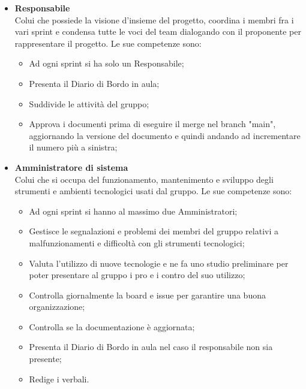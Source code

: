             \begin{itemize}
                \item \textbf{Responsabile}\\
                Colui che possiede la visione d'insieme del progetto, coordina i membri fra i vari sprint e condensa tutte le voci del team
                dialogando con il proponente per rappresentare il progetto.
                Le sue competenze sono:
                \begin{itemize}
                    \item Ad ogni sprint si ha solo un Responsabile;
                    \item Presenta il Diario di Bordo in aula;
                    \item Suddivide le attività del gruppo;
                    \item Approva i documenti prima di eseguire il merge nel branch "main", aggiornando la versione del documento e quindi andando ad incrementare il numero più a sinistra;
                \end{itemize}
                \item \textbf{Amministratore di sistema}\\
                Colui che si occupa del funzionamento, mantenimento e sviluppo degli strumenti e ambienti tecnologici
                usati dal gruppo.
                Le sue competenze sono:
                \begin{itemize}
                    \item Ad ogni sprint si hanno al massimo due Amministratori;
                    \item Gestisce le segnalazioni e problemi dei membri del gruppo relativi a malfunzionamenti e difficoltà con gli strumenti tecnologici;
                    \item Valuta l'utilizzo di nuove tecnologie e ne fa uno studio preliminare per poter presentare al
                    gruppo i pro e i contro del suo utilizzo;
                    \item Controlla giornalmente la board e issue per garantire una buona organizzazione;
                    \item Controlla se la documentazione è aggiornata;
                    \item Presenta il Diario di Bordo in aula nel caso il responsabile non sia presente;
                    \item Redige i verbali.
                    \end{itemize}

\end{itemize}
